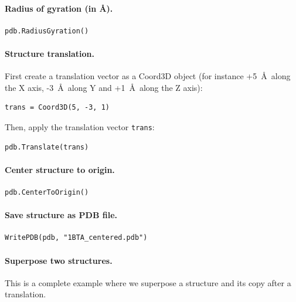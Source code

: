 \documentclass[12pt,a4paper]{article}
\begin{document}
\paragraph{Radius of gyration (in \AA).}
\begin{verbatim}
pdb.RadiusGyration()
\end{verbatim}


\paragraph{Structure translation.}
First create a translation vector as a Coord3D object (for instance +5~\AA\ along the X axis, -3~\AA\ along Y and +1~\AA\ along the Z axis):
\begin{verbatim}
trans = Coord3D(5, -3, 1)
\end{verbatim}
Then, apply the translation vector {\tt trans}:
\begin{verbatim}
pdb.Translate(trans)
\end{verbatim}


\paragraph{Center structure to origin.}
\begin{verbatim}
pdb.CenterToOrigin()
\end{verbatim}


\paragraph{Save structure as PDB file.}
\begin{verbatim}
WritePDB(pdb, "1BTA_centered.pdb")
\end{verbatim}


\paragraph{Superpose two structures.} This is a complete example where we
superpose a structure and its copy after a translation.\\
\end{document}
